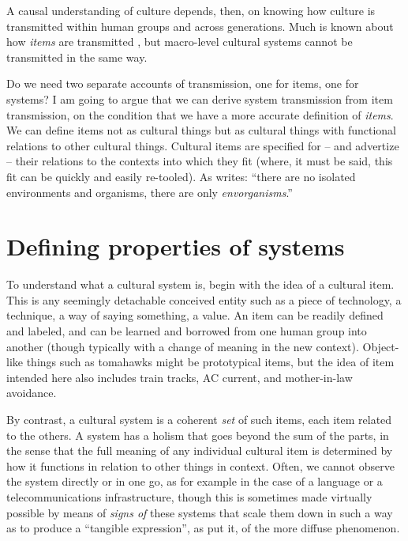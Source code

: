 A causal understanding of culture depends, then, on knowing how culture is transmitted within human groups and across 
generations. Much is known about how \textit{items} are transmitted 
\citep{rogers_diffusion_2003}, but macro-level cultural systems cannot be 
transmitted in the same way. 



Do we need two separate accounts of transmission, one for items, one for 
systems? I am going to argue that we can derive system transmission from 
item transmission, on the condition that we have a more accurate 
definition of \textit{items}. We can define items not as cultural things but as 
cultural things with functional relations to other cultural things. 
Cultural items are specified for -- and advertize -- their relations to the 
contexts into which they fit (where, it must be said, this fit can be 
quickly and easily re-tooled). As \citet[19]{kockelman_agent_2013} writes: ``there 
are no isolated environments and organisms, there are only \textit{envorganisms}.'' 

\section{Defining properties of systems}

To understand what a cultural system is, begin with the idea of a cultural item. This is any seemingly detachable conceived entity such 
as a piece of technology, a technique, a way of saying something, a 
value. An item can be readily defined and labeled, and can be learned 
and borrowed from one human group into another (though typically with 
a change of meaning in the new context). Object-like 
things such as tomahawks might be prototypical items, but the idea of 
item intended here also includes train tracks, AC current, and 
mother-in-law avoidance. 



By contrast, a cultural system is a coherent \textit{set} of such items, each 
item related to the others. A system has a holism that goes 
beyond the sum of the parts, in the sense that the full meaning of any 
individual cultural item is determined by how it functions in relation to other things in context. Often, we cannot observe the system directly or in one go, as for 
example in the case of a language or a telecommunications 
infrastructure, though this is sometimes made virtually possible by 
means of \textit{signs of} these systems that scale them down in such 
a way as to produce a ``tangible expression'', as \citet[208]{durkheim_elementary_1912} put it, of the more diffuse phenomenon. 



